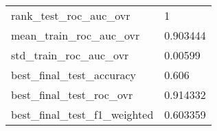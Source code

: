 \begin{tabular}{ll}
rank\_test\_roc\_auc\_ovr       &                                                  1 \\
mean\_train\_roc\_auc\_ovr      &                                           0.903444 \\
std\_train\_roc\_auc\_ovr       &                                            0.00599 \\
best\_final\_test\_accuracy    &                                              0.606 \\
best\_final\_test\_roc\_ovr     &                                           0.914332 \\
best\_final\_test\_f1\_weighted &                                           0.603359 \\
\bottomrule
\end{tabular}
